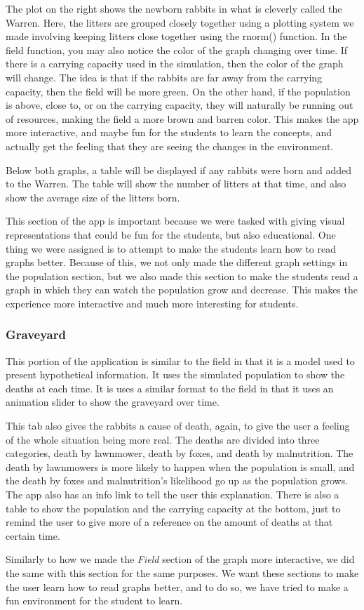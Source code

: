 \documentclass{article}\usepackage[]{graphicx}\usepackage[]{color}
\begin{document}
The plot on the right shows the newborn rabbits in what is cleverly called the Warren. Here, the litters are grouped closely together using a plotting system we made involving keeping litters close together using the rnorm() function. In the field function, you may also notice the color of the graph changing over time. If there is a carrying capacity used in the simulation, then the color of the graph will change. The idea is that if the rabbits are far away from the carrying capacity, then the field will be more green. On the other hand, if the population is above, close to, or on the carrying capacity, they will naturally be running out of resources, making the field a more brown and barren color. This makes the app more interactive, and maybe fun for the students to learn the concepts, and actually get the feeling that they are seeing the changes in the environment. 

Below both graphs, a table will be displayed if any rabbits were born and added to the Warren. The table will show the number of litters at that time, and also show the average size of the litters born.

This section of the app is important because we were tasked with giving visual representations that could be fun for the students, but also educational. One thing we were assigned is to attempt to make the students learn how to read graphs better. Because of this, we not only made the different graph settings in the population section, but we also made this section to make the students read a graph in which they can watch the population grow and decrease. This makes the experience more interactive and much more interesting for students.

\subsubsection{Graveyard}

This portion of the application is similar to the field in that it is a model used to present hypothetical information. It uses the simulated population to show the deaths at each time. It is uses a similar format to the field in that it uses an animation slider to show the graveyard over time. 

This tab also gives the rabbits a cause of death, again, to give the user a feeling of the whole situation being more real. The deaths are divided into three categories, death by lawnmower, death by foxes, and death by malnutrition. The death by lawnmowers is more likely to happen when the population is small, and the death by foxes and malnutrition's likelihood go up as the population grows. The app also has an info link to tell the user this explanation. There is also a table to show the population and the carrying capacity at the bottom, just to remind the user to give more of a reference on the amount of deaths at that certain time. 

Similarly to how we made the \textit{Field} section of the graph more interactive, we did the same with this section for the same purposes. We want these sections to make the user learn how to read graphs better, and to do so, we have tried to make a fun environment for the student to learn.
\end{document}
